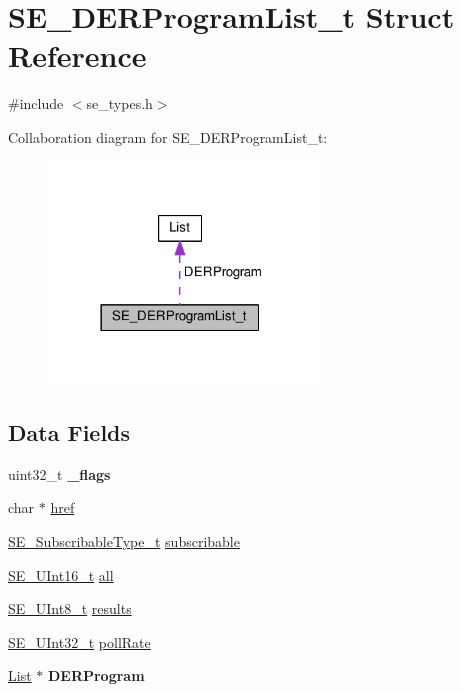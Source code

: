 \hypertarget{structSE__DERProgramList__t}{}\section{S\+E\+\_\+\+D\+E\+R\+Program\+List\+\_\+t Struct Reference}
\label{structSE__DERProgramList__t}


{\ttfamily \#include $<$se\+\_\+types.\+h$>$}



Collaboration diagram for S\+E\+\_\+\+D\+E\+R\+Program\+List\+\_\+t\+:\nopagebreak
\begin{figure}[H]
\begin{center}
\leavevmode
\includegraphics[width=201pt]{structSE__DERProgramList__t__coll__graph}
\end{center}
\end{figure}
\subsection*{Data Fields}
\begin{DoxyCompactItemize}
\item 
uint32\+\_\+t {\bfseries \+\_\+flags}
\item 
char $\ast$ \hyperlink{group__DERProgramList_gad8fa23267d2231b0402935da3ac7ef59}{href}
\item 
\hyperlink{group__SubscribableType_ga5c41f553d369710ed34619266bf2551e}{S\+E\+\_\+\+Subscribable\+Type\+\_\+t} \hyperlink{group__DERProgramList_gac3b255db4914973bb3d51e1b104ca485}{subscribable}
\item 
\hyperlink{group__UInt16_gac68d541f189538bfd30cfaa712d20d29}{S\+E\+\_\+\+U\+Int16\+\_\+t} \hyperlink{group__DERProgramList_ga2d6ff72e19fafdcdceed6255c9770524}{all}
\item 
\hyperlink{group__UInt8_gaf7c365a1acfe204e3a67c16ed44572f5}{S\+E\+\_\+\+U\+Int8\+\_\+t} \hyperlink{group__DERProgramList_gaef78d7616581dd0227f68b61f00a2c02}{results}
\item 
\hyperlink{group__UInt32_ga70bd4ecda3c0c85d20779d685a270cdb}{S\+E\+\_\+\+U\+Int32\+\_\+t} \hyperlink{group__DERProgramList_gaad6d0952e709c97938d369ddb2da093f}{poll\+Rate}
\item 
\hyperlink{structList}{List} $\ast$ {\bfseries D\+E\+R\+Program}
\end{DoxyCompactItemize}


